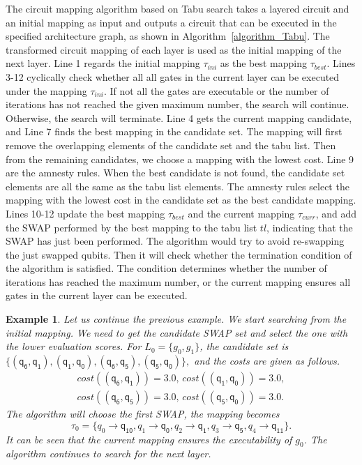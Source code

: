 \documentclass[journal]{IEEEtran}
\newtheorem{example}{Example}[section]
\begin{document}
	The circuit mapping algorithm based on Tabu search takes a layered circuit and an initial mapping as input and outputs a circuit that can be executed in the specified architecture graph, as shown in Algorithm~\ref{algorithm_Tabu}. The transformed circuit mapping of each layer is used as the initial mapping of the next layer. 
	Line 1 regards the initial mapping $\tau_{ini}$ as the best mapping $\tau_{best}$. Lines 3-12 cyclically check whether all all gates in the current layer can be executed under the mapping $\tau_{ini}$. If not all the gates are executable or the number of iterations has not reached the given maximum number, the search will continue. Otherwise, the search will terminate. Line 4 gets the current mapping candidate, and Line 7 finds the best mapping in the candidate set. The mapping will first remove the overlapping elements of the candidate set and the tabu list. Then from the remaining candidates, we choose a mapping with the lowest cost. Line 9 are the amnesty rules. When the best candidate is not found, the candidate set elements are all the same as the tabu list elements. The amnesty rules select the mapping with the lowest cost in the candidate set as the best candidate mapping. Lines 10-12 update the best mapping $\tau_{best}$ and the current mapping $\tau_{curr}$, and add the SWAP performed by the best mapping to the tabu list $tl$, indicating that the SWAP has just been performed. 
	The algorithm would try to avoid re-swapping the just swapped qubits. Then it will check whether the termination condition of the algorithm is satisfied. The condition determines whether the number of iterations has reached the maximum number, or the current mapping ensures all gates in the current layer can be executed. 
\begin{example}
Let us continue the previous example. We start searching from the initial mapping. We need to get the candidate SWAP set and select the one with the lower evaluation scores.
For $L_{0}=\{g_{0},g_{1}\}$, the candidate set is 
$\{(\textsf{q}_\textsf{6},\textsf{q}_\textsf{1}), (\textsf{q}_\textsf{1},\textsf{q}_\textsf{0}), (\textsf{q}_\textsf{6},\textsf{q}_\textsf{5}), (\textsf{q}_\textsf{5},\textsf{q}_\textsf{0}) \} , $ and the costs are given as follows.
\[\begin{array}{l}
cost((\textsf{q}_\textsf{6},\textsf{q}_\textsf{1}))=3.0, \, cost((\textsf{q}_\textsf{1},\textsf{q}_\textsf{0}))=3.0,\\ cost((\textsf{q}_\textsf{6},\textsf{q}_\textsf{5}))=3.0, \, cost((\textsf{q}_\textsf{5},\textsf{q}_\textsf{0}))=3.0 .
\end{array}\]
The algorithm will choose the first SWAP, the mapping becomes $$\tau_{0}=\{\textit{q}_\textit{0}\rightarrow  \textsf{q}_\textsf{10},\textit{q}_\textit{1}\rightarrow  \textsf{q}_\textsf{0},
\textit{q}_\textit{2}\rightarrow  \textsf{q}_\textsf{1},\textit{q}_\textit{3}\rightarrow  \textsf{q}_\textsf{5},\textit{q}_\textit{4}\rightarrow  \textsf{q}_\textsf{11}\} . $$ 
 It can be seen that the current mapping ensures the executability of $g_{0}$. The algorithm continues to search for the next layer.
\end{example}
\end{document}
